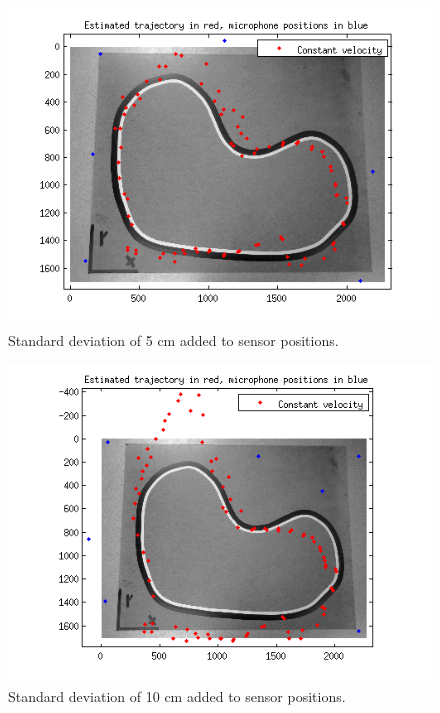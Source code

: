 \documentclass[10pt,a4paper]{report}
\begin{document}
\begin{figure}[H]
\begin{center}
  \includegraphics[width = 350pt]{sens_std05.png}
  \caption{Standard deviation of 5 cm added to sensor positions.}
  \label{sens_5}
  \end{center}
\end{figure}
\begin{figure}[H]
\begin{center}
  \includegraphics[width = 350pt]{sens_std10.png}
  \caption{Standard deviation of 10 cm added to sensor positions.}
  \label{sens_10}
  \end{center}
\end{figure}
\end{document}
